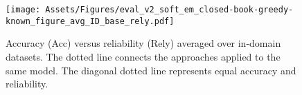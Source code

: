 \begin{figure}[t]
    \centering
    \texttt{[image: Assets/Figures/eval\_v2\_soft\_em\_closed-book-greedy-known\_figure\_avg\_ID\_base\_rely.pdf]} 
    \caption{Accuracy (Acc) versus reliability (Rely) averaged over in-domain datasets. The dotted line connects the approaches applied to the same model. The diagonal dotted line represents equal accuracy and reliability.}
    \label{figure:eval_v2_ID_base_rely}
\end{figure}